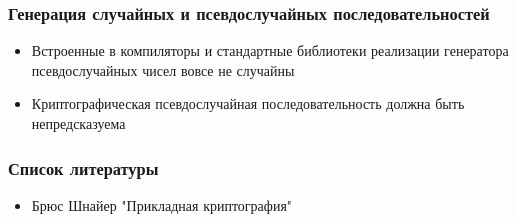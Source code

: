 \documentclass{beamer}
\begin{document}
\begin{frame}
  \frametitle{Генерация случайных и псевдослучайных последовательностей}

  \begin{itemize}
    \item{Встроенные в компиляторы и стандартные библиотеки реализации генератора псевдослучайных чисел вовсе не случайны}
    \item{Криптографическая псевдослучайная последовательность должна быть непредсказуема}
  \end{itemize}
\end{frame}


\begin{frame}
  \frametitle{Список литературы}
  \begin{itemize}
    \item{Брюс Шнайер "Прикладная криптография"}
  \end{itemize}
\end{frame}
\end{document}
